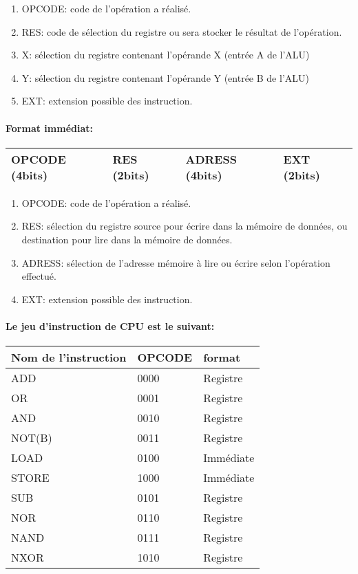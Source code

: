 \begin{enumerate}
\item OPCODE: code de l’opération a réalisé.
\item RES: code de sélection du registre ou sera stocker le résultat de l'opération.
\item X: sélection du registre contenant l’opérande X (entrée A de l'ALU)
\item Y: sélection du registre contenant l’opérande Y (entrée B de l'ALU)
\item EXT: extension possible des instruction.
\end{enumerate}

\paragraph{Format immédiat:}

\begin{center}
\begin{tabular} {|p{3cm}|p{2cm}|p{3cm}|p{2.1cm}|}
\hline
OPCODE (4bits) & RES (2bits) & ADRESS (4bits) & EXT (2bits) \\
\hline
\end{tabular}
\end{center}

\begin{enumerate}
\item OPCODE: code de l’opération a réalisé.
\item RES: sélection du registre source pour écrire dans la mémoire de données, ou destination pour lire dans la mémoire de données.
\item ADRESS: sélection de l'adresse mémoire à lire ou écrire selon l’opération effectué.
\item EXT: extension possible des instruction.
\end{enumerate}

\paragraph{Le jeu d'instruction de CPU est le suivant:}

\begin{center}
\begin{tabular} {|p{3.5cm}|p{2cm}|p{1.7cm}|}
\hline
Nom de l'instruction & OPCODE & format \\
\hline
ADD & 0000 & Registre \\
\hline
OR & 0001 & Registre \\
\hline
AND & 0010 & Registre \\
\hline
NOT(B) & 0011 & Registre \\
\hline
LOAD & 0100 & Immédiate \\
\hline
STORE & 1000 & Immédiate \\
\hline
SUB & 0101 & Registre \\
\hline
NOR & 0110 & Registre \\
\hline
NAND & 0111 & Registre \\
\hline
NXOR & 1010 & Registre \\
\hline
\end{tabular}
\end{center}


